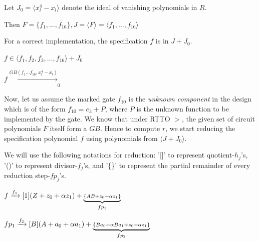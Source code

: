 \begin{Example}
Let $J_0 = \langle x_l^4 - x_l\rangle$ denote the ideal of vanishing
polynomials in $R$. 
\begin{small}
Then $F = \{f_1,\dots,f_{16}\}, J = \langle F\rangle = \langle
f_1,\dots,f_{16}\rangle$
\end{small}

For a correct implementation, the specification $f$ is in $J + J_0$.

$f \in \langle f_1,f_2,f_3,\dots,f_{16}\rangle+J_0$

$f \xrightarrow[]{GB(f_1\dots f_{16}, x_l^4-x_l)}_0$

Now, let us assume the marked gate $f_{10}$ is the \textit{unknown
  component} in the design which is of the form $f_{10} = e_3 + P$,
where $P$ is the unknown function to be implemented by the gate. We
know that under RTTO $>$, the given set of circuit polynomials $F$
itself form a $GB$. Hence to compute $r$, we start reducing the 
specification polynomial $f$ using polynomials from $\langle J + J_0\rangle$.  

We will use the following notations for reduction: '[]' to represent quotient-$h_j$'s, '()' to represent divisor-$f_j$'s, and '\{\}' to represent the partial remainder of every reduction step-$fp_j$'s.

\begin{tiny}
$f\xrightarrow[]{f_{1}}[1](Z + z_0 +\alpha z_1)+\underbrace{{\scriptstyle \{AB+z_0+\alpha z_1\}}}_\text{$fp_1$}$

$fp_1\xrightarrow[]{f_2}[B](A+a_0+\alpha a_1)+\underbrace{{\scriptstyle \{Ba_0+\alpha Ba_1+z_0+\alpha z_1\}}}_\text{$fp_2$}$


\end{tiny}
\end{Example}
